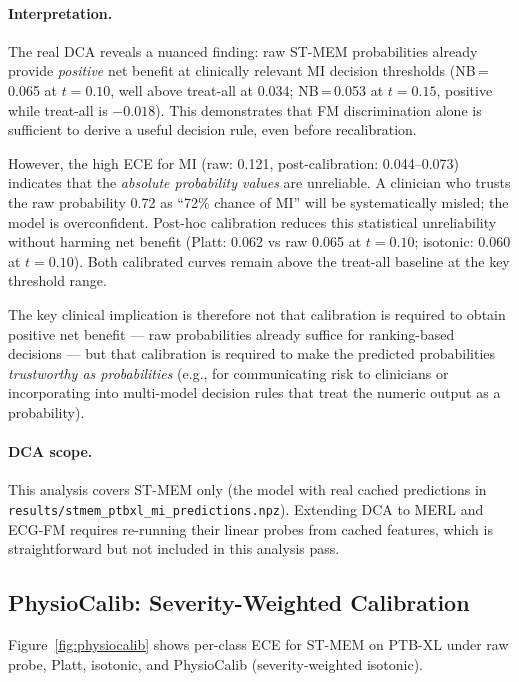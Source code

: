 \paragraph{Interpretation.}
The real DCA reveals a nuanced finding: raw ST-MEM probabilities already provide \emph{positive}
net benefit at clinically relevant MI decision thresholds (NB\,=\,0.065 at $t=0.10$,
well above treat-all at 0.034; NB\,=\,0.053 at $t=0.15$, positive while treat-all is
$-0.018$). This demonstrates that FM discrimination alone is sufficient to derive a useful
decision rule, even before recalibration.

However, the high ECE for MI (raw: 0.121, post-calibration: 0.044--0.073) indicates that the
\emph{absolute probability values} are unreliable. A clinician who trusts the raw probability
0.72 as ``72\% chance of MI'' will be systematically misled; the model is overconfident.
Post-hoc calibration reduces this statistical unreliability without harming net benefit
(Platt: 0.062 vs raw 0.065 at $t=0.10$; isotonic: 0.060 at $t=0.10$). Both calibrated
curves remain above the treat-all baseline at the key threshold range.

The key clinical implication is therefore not that calibration is required to obtain positive
net benefit --- raw probabilities already suffice for ranking-based decisions --- but that
calibration is required to make the predicted probabilities \emph{trustworthy as probabilities}
(e.g., for communicating risk to clinicians or incorporating into multi-model decision rules
that treat the numeric output as a probability).

\paragraph{DCA scope.}
This analysis covers ST-MEM only (the model with real cached predictions in
\texttt{results/stmem\_ptbxl\_mi\_predictions.npz}).
Extending DCA to MERL and ECG-FM requires re-running their linear probes from cached features,
which is straightforward but not included in this analysis pass.

\subsection{PhysioCalib: Severity-Weighted Calibration}

Figure~\ref{fig:physiocalib} shows per-class ECE for ST-MEM on PTB-XL under raw probe,
Platt, isotonic, and PhysioCalib (severity-weighted isotonic).


